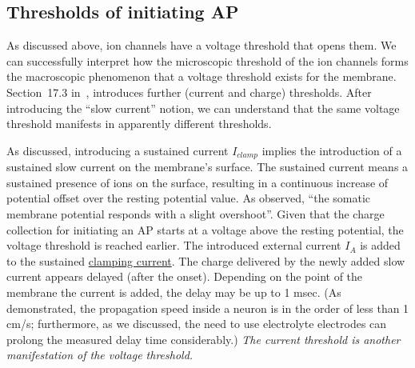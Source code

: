 \subsection{Thresholds of initiating AP\label{sec:Physiology-FallaciesAPThresholds}}

As discussed above, ion channels have a voltage threshold that opens
them. We can successfully interpret how the microscopic threshold
of the ion channels forms the macroscopic phenomenon that a voltage
threshold exists for the membrane. Section~17.3 in~\cite{KochBiophysics:1999},
introduces further (current and charge) thresholds. After introducing
the ``slow current'' notion, we can understand that the same voltage
threshold manifests in apparently different thresholds.

As discussed, introducing a sustained current $I_{clamp}$
implies the introduction of a sustained slow current on the membrane's
surface. The sustained current means a sustained presence of ions on the surface, resulting in a continuous increase of potential offset over the resting potential value. As observed, ``the somatic membrane
potential responds with a slight overshoot''. Given that the charge
collection for initiating an 
AP starts at a voltage above the
resting potential, the voltage threshold is reached earlier. The introduced
external current $I_{A}$ is added to the sustained \hyperlink{voltage-clamping}{clamping current}.
The charge delivered by the newly added slow current appears delayed
(after the onset). Depending on the point of the membrane the current
is added, the delay may be up to 1 msec. (As \cite{ActionPotentialGenerationNatrium:2008}
demonstrated, the propagation speed inside a neuron is in the order
of less than 1 cm/s; furthermore, as we discussed, the need to use
electrolyte electrodes can prolong the measured delay time considerably.)
\emph{The current threshold is another manifestation of the voltage
	threshold.}

